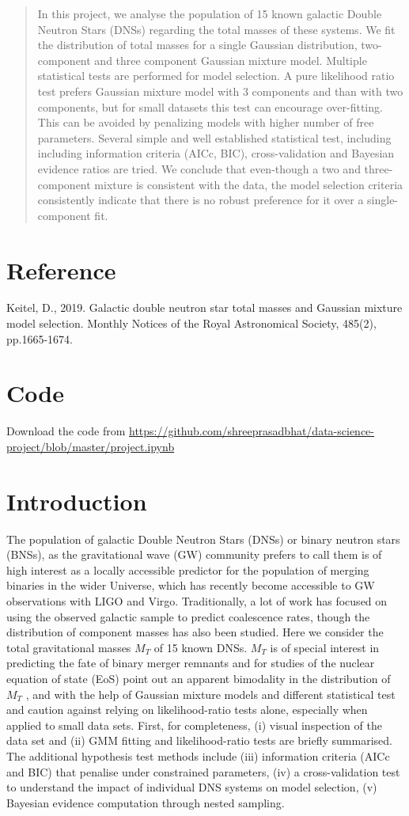 \documentclass[journal,12pt,twocolumn]{IEEEtran}
\begin{document}
\begin{abstract}
In this project, we analyse the population of 15 known galactic Double Neutron Stars (DNSs) regarding the total masses of these systems. We fit the distribution of total masses for a single Gaussian distribution, two-component and three component Gaussian mixture model. Multiple statistical tests are performed for model selection. A pure likelihood ratio test prefers Gaussian mixture model with 3 components and than with two components, but for small datasets this test can encourage over-fitting. This can be avoided by penalizing models with higher number of free parameters. Several simple and well established statistical test, including including information criteria (AICc, BIC), cross-validation and Bayesian evidence ratios are tried. We conclude that even-though a two and three-component mixture is consistent with the data, the model selection criteria consistently indicate that there is no robust preference for it over a single-component fit.\end{abstract}
\tableofcontents
\section{Reference}
Keitel, D., 2019. Galactic double neutron star total masses and Gaussian mixture model selection. Monthly Notices of the Royal Astronomical Society, 485(2), pp.1665-1674.
\section{Code}
Download the code from \textcolor{gray}{\url{https://github.com/shreeprasadbhat/data-science-project/blob/master/project.ipynb}}
\section{Introduction}
The population of galactic Double Neutron Stars (DNSs) or binary neutron stars (BNSs), as the gravitational wave (GW) community prefers to call them is of high interest as a locally accessible predictor for the population of merging binaries in the wider Universe, which has recently become accessible to GW observations with LIGO and Virgo. Traditionally, a lot of work has focused on using the observed galactic sample to predict coalescence rates, though the distribution of component masses has also been studied. Here we consider the total gravitational masses $M_{T}$ of 15 known DNSs. $M_{T}$ is of special interest in predicting the fate of binary merger remnants and for studies of the nuclear equation of state (EoS) point out an apparent bimodality in the distribution of $M_{T}$ , and with the help of Gaussian mixture models and different statistical test and caution against relying on likelihood-ratio tests alone, especially when applied to small data sets. First, for completeness, (i) visual inspection of the data set and (ii) GMM fitting and likelihood-ratio tests are briefly summarised. The additional hypothesis test methods include (iii) information criteria (AICc and BIC) that penalise under constrained parameters, (iv) a cross-validation test to understand the impact of individual DNS systems on model selection, (v) Bayesian evidence computation through nested sampling.
\end{document}
